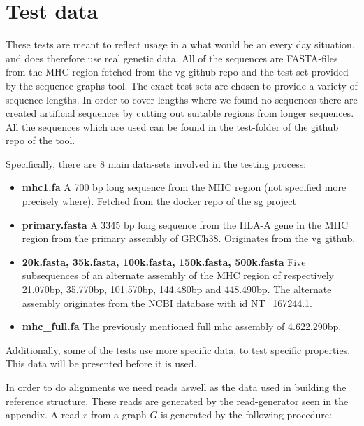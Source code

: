 \documentclass[thesis.tex]{subfiles}
\begin{document}
\section{Test data}
These tests are meant to reflect usage in a what would be an every day situation, and does therefore use real genetic data. All of the sequences are FASTA-files from the MHC region fetched from the vg github repo\cite{vg} and the test-set provided by the sequence graphs tool\cite{sequence_graphs}. The exact test sets are chosen to provide a variety of sequence lengths. In order to cover lengths where we found no sequences there are created artificial sequences by cutting out suitable regions from longer sequences. All the sequences which are used can be found in the test-folder of the github repo of the tool.\\
\par\noindent
Specifically, there are 8 main data-sets involved in the testing process:
\begin{itemize}
  \item \textbf{mhc1.fa} A 700 bp long sequence from the MHC region (not specified more precisely where). Fetched from the docker repo of the sg project
  \item \textbf{primary.fasta} A 3345 bp long sequence from the HLA-A gene in the MHC region from the primary assembly of GRCh38. Originates from the vg github.
  \item \textbf{20k.fasta, 35k.fasta, 100k.fasta, 150k.fasta, 500k.fasta} Five subsequences of an alternate assembly of the MHC region of respectively 21.070bp, 35.770bp, 101.570bp, 144.480bp and 448.490bp. The alternate assembly originates from the NCBI database\cite{ncbi} with id NT\_167244.1.
  \item \textbf{mhc\_full.fa} The previously mentioned full mhc assembly of 4.622.290bp.
\end{itemize}
Additionally, some of the tests use more specific data, to test specific properties. This data will be presented before it is used.\\
\par\noindent
In order to do alignments we need reads aswell as the data used in building the reference structure. These reads are generated by the read-generator seen in the appendix. A read $r$ from a graph $G$ is generated by the following procedure:
\end{document}
